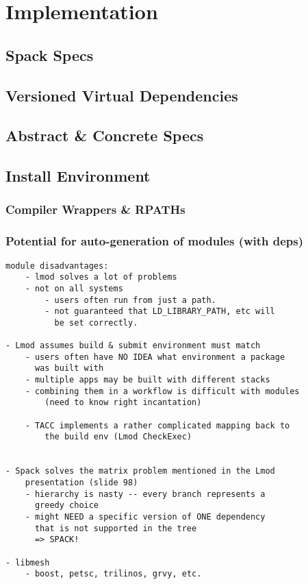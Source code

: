 
\section{Implementation}
\label{sec:implementation}



\subsection{Spack Specs}
	
\subsection{Versioned Virtual Dependencies}

\subsection{Abstract \& Concrete Specs}
	
\subsection{Install Environment}

\subsubsection{Compiler Wrappers \& RPATHs}

\subsubsection{Potential for auto-generation of modules (with deps)}

\begin{verbatim}
module disadvantages:
	- lmod solves a lot of problems
	- not on all systems
		- users often run from just a path.
		- not guaranteed that LD_LIBRARY_PATH, etc will
		  be set correctly.

- Lmod assumes build & submit environment must match
	- users often have NO IDEA what environment a package
	  was built with
	- multiple apps may be built with different stacks
	- combining them in a workflow is difficult with modules
		(need to know right incantation)

	- TACC implements a rather complicated mapping back to
	    the build env (Lmod CheckExec)
	

- Spack solves the matrix problem mentioned in the Lmod
    presentation (slide 98)
	- hierarchy is nasty -- every branch represents a
	  greedy choice
	- might NEED a specific version of ONE dependency
	  that is not supported in the tree
	  => SPACK!

- libmesh
	- boost, petsc, trilinos, grvy, etc.
\end{verbatim}
